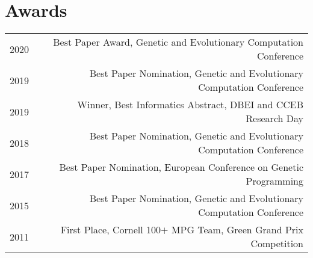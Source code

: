\section*{Awards}
\begin{tabular}{L!{\VRule}R}
2020& Best Paper Award, Genetic and Evolutionary Computation Conference  \\
2019& Best Paper Nomination, Genetic and Evolutionary Computation Conference  \\
2019& Winner, Best Informatics Abstract, DBEI and CCEB Research Day\\
2018& Best Paper Nomination, Genetic and Evolutionary Computation Conference  \\
2017& Best Paper Nomination, European Conference on Genetic Programming  \\
2015& Best Paper Nomination, Genetic and Evolutionary Computation Conference  \\
2011& First Place, Cornell 100$+$ MPG Team, Green Grand Prix Competition \\
\end{tabular}
